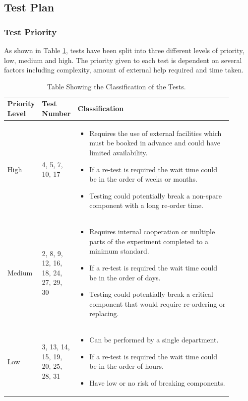\documentclass[a4paper,12pt,twoside]{article}
\providecommand{\DIFaddtex}[1]{{\protect\color{blue}\uwave{#1}}} %
\providecommand{\DIFaddFL}[1]{\DIFadd{#1}} %
\providecommand{\DIFaddbeginFL}{} %
\providecommand{\DIFaddendFL}{} %
\providecommand{\DIFadd}[1]{\texorpdfstring{\DIFaddtex{#1}}{#1}} %
\newcommand{\DIFaddincludegraphics}[2][]{{\color{blue}\fbox{\DIFOincludegraphics[#1]{#2}}}} %
\DeclareRobustCommand{\DIFaddbeginFL}{\DIFOaddbeginFL \let\includegraphics\DIFaddincludegraphics} %
\DeclareRobustCommand{\DIFaddendFL}{\DIFOaddendFL \let\includegraphics\DIFOincludegraphics} %
\begin{document}
\subsection{Test Plan}

\subsubsection{Test Priority} \label{sec:5.2.1-testpriority}
As shown in Table \ref{tab:classification}, tests have been split into three different levels of priority, low, medium and high. The priority given to each test is dependent on several factors including complexity, amount of external help required and time taken. 

\begin{table}[H]
\centering
\begin{tabular}{|p{0.1\linewidth}|p{0.1\linewidth}|p{0.7\linewidth}|}
\hline
\textbf{Priority Level} & \textbf{Test Number} & \textbf{Classification} \\ \hline
High & 4, 5, 7, 10, 17 & \begin{itemize}
    \item Requires the use of external facilities which must be booked in advance and could have limited availability.
    \item If a re-test is required the wait time could be in the order of weeks or months.
    \item Testing could potentially break a non-spare component with a long re-order time.
\end{itemize}\\ \hline
Medium & 2, 8, 9, 12, 16, 18, 24, 27, 29, 30 & \begin{itemize}
    \item Requires internal cooperation or multiple parts of the experiment completed to a minimum standard.
    \item If a re-test is required the wait time could be in the order of days.
    \item Testing could potentially break a critical component that would require re-ordering or replacing.
\end{itemize} \\ \hline
Low & 3, 13, 14, 15, 19, 20, 25, 28, 31\DIFaddbeginFL \DIFaddFL{, 32 }\DIFaddendFL & \begin{itemize}
    \item Can be performed by a single department.
    \item If a re-test is required the wait time could be in the order of hours.
    \item Have low or no risk of breaking components.
\end{itemize} \\ \hline
\end{tabular}
\caption{Table Showing the Classification of the Tests.}
\label{tab:classification}
\end{table}
\end{document}
